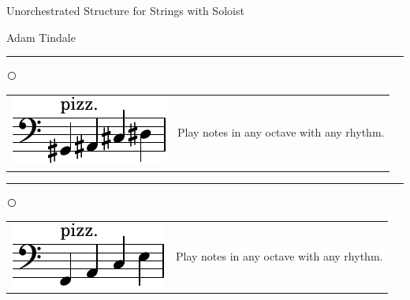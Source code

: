\documentclass[12pt]{article}
\begin{document}
\begin{center}
{\Huge Unorchestrated Structure for Strings with Soloist}
\end{center}

\vspace{0.2cm}

\begin{flushright}
Adam Tindale
\end{flushright}

\vspace{0.3cm}

\hrule

\vspace{0.1cm}

\textcircled{}

\begin{tabular}{l l}
\begin{minipage}{0.5\textwidth}
\includegraphics[scale=1.5]{gacdbasspizz.pdf}
\end{minipage}
&
\begin{minipage}{0.5\textwidth}
Play notes in any octave with any rhythm.
\end{minipage}
\end{tabular}

\vspace{0.3cm}

\hrule

\vspace{0.1cm}

\textcircled{}


\begin{tabular}{l l}
\begin{minipage}{0.5\textwidth}
\includegraphics[scale=1.5]{facebasspizz.pdf} 
\end{minipage}
&
\begin{minipage}{0.5\textwidth}
Play notes in any octave with any rhythm.
\end{minipage}
\end{tabular}
\end{document}
